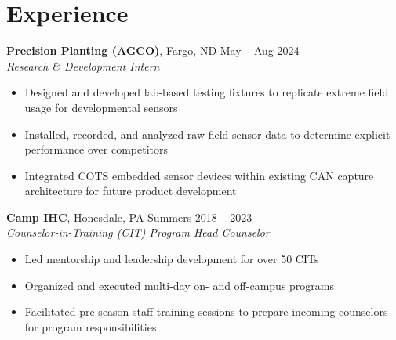 \documentclass[10pt]{article}
\begin{document}
\section*{Experience}
\textbf{Precision Planting (AGCO)}, Fargo, ND \hfill May -- Aug 2024 \\
\textit{Research \& Development Intern}
\begin{itemize}
  \item Designed and developed lab-based testing fixtures to replicate extreme field usage for developmental sensors
  \item Installed, recorded, and analyzed raw field sensor data to determine explicit performance over competitors
  \item Integrated COTS embedded sensor devices within existing CAN capture architecture for future product development
\end{itemize}
\vspace{0.5em}
\textbf{Camp IHC}, Honesdale, PA \hfill Summers 2018 -- 2023 \\
\textit{Counselor-in-Training (CIT) Program Head Counselor}
\begin{itemize}
  \item Led mentorship and leadership development for over 50 CITs
  \item Organized and executed multi-day on- and off-campus programs
  \item Facilitated pre-season staff training sessions to prepare incoming counselors for program responsibilities
\end{itemize}
\end{document}
